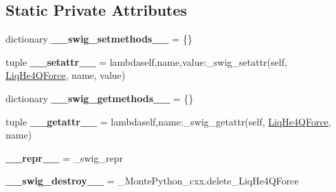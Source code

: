 \subsection*{Static Private Attributes}
\begin{DoxyCompactItemize}
\item 
\hypertarget{classMontePython__cxx_1_1LiqHe4QForce_a439844b84804e3e711524a2a61577b99}{}dictionary {\bfseries \+\_\+\+\_\+swig\+\_\+setmethods\+\_\+\+\_\+} = \{\}\label{classMontePython__cxx_1_1LiqHe4QForce_a439844b84804e3e711524a2a61577b99}

\item 
\hypertarget{classMontePython__cxx_1_1LiqHe4QForce_ab3e449d56948fbad2b017002a9fbb435}{}tuple {\bfseries \+\_\+\+\_\+setattr\+\_\+\+\_\+} = lambdaself,name,value\+:\+\_\+swig\+\_\+setattr(self, \hyperlink{classMontePython__cxx_1_1LiqHe4QForce}{Liq\+He4\+Q\+Force}, name, value)\label{classMontePython__cxx_1_1LiqHe4QForce_ab3e449d56948fbad2b017002a9fbb435}

\item 
\hypertarget{classMontePython__cxx_1_1LiqHe4QForce_a119d3f8e1f8dbd8377fdcbea800c7576}{}dictionary {\bfseries \+\_\+\+\_\+swig\+\_\+getmethods\+\_\+\+\_\+} = \{\}\label{classMontePython__cxx_1_1LiqHe4QForce_a119d3f8e1f8dbd8377fdcbea800c7576}

\item 
\hypertarget{classMontePython__cxx_1_1LiqHe4QForce_ab1d6f91bd207b303dc323001a6dd383f}{}tuple {\bfseries \+\_\+\+\_\+getattr\+\_\+\+\_\+} = lambdaself,name\+:\+\_\+swig\+\_\+getattr(self, \hyperlink{classMontePython__cxx_1_1LiqHe4QForce}{Liq\+He4\+Q\+Force}, name)\label{classMontePython__cxx_1_1LiqHe4QForce_ab1d6f91bd207b303dc323001a6dd383f}

\item 
\hypertarget{classMontePython__cxx_1_1LiqHe4QForce_a734e59fdd57e7d74a7f0eee7061d94a5}{}{\bfseries \+\_\+\+\_\+repr\+\_\+\+\_\+} = \+\_\+swig\+\_\+repr\label{classMontePython__cxx_1_1LiqHe4QForce_a734e59fdd57e7d74a7f0eee7061d94a5}

\item 
\hypertarget{classMontePython__cxx_1_1LiqHe4QForce_a30beecd7d7bbb98fcdebcd78e2dd58d3}{}{\bfseries \+\_\+\+\_\+swig\+\_\+destroy\+\_\+\+\_\+} = \+\_\+\+Monte\+Python\+\_\+cxx.\+delete\+\_\+\+Liq\+He4\+Q\+Force\label{classMontePython__cxx_1_1LiqHe4QForce_a30beecd7d7bbb98fcdebcd78e2dd58d3}

\end{DoxyCompactItemize}


